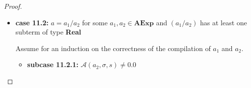 \documentclass{article}
\begin{document}
\begin{proof}
\begin{itemize}
\begin{itemize}
            \[
              \begin{aligned}
                &\langle  \mathcal{CA}(a) : c,\, e,\, \sigma,\, s,\, pc \rangle \\
                &= \langle \mathcal{CA}(a_1 / a_2) : c,\, e,\, \sigma,\, s,\, pc \rangle \\
                &= \langle \mathcal{CA}(a_2) : \mathcal{CA}(a_1) : \texttt{iDIV} :  c,\, e,\, \sigma,\, s,\, pc \rangle 
                && \text{(definition of } \mathcal{CA}\text{)} \\
                &\triangleright^{\ast} \langle \mathcal{CA}(a_1) : \texttt{iDIV} :  c,\, \mathcal{A}(a_2, \sigma, s) : e,\, \sigma,\, s,\, pc + l_2 \rangle 
                && \text{(induction hypothesis 2)} \\
                &= \langle \mathcal{CA}(a_1) : \texttt{iDIV} :  c,\, 0 : e,\, \sigma,\, s,\, pc + l_2 \rangle \\
                &\triangleright^{\ast} \langle \texttt{iDIV} :  c,\, \mathcal{A}(a_1, \sigma, s) : 0 : e,\, \sigma,\, s,\, pc + l_2 + l_1 \rangle
                && \text{(induction hypothesis 1)} \\
                &\triangleright \langle c,\, \bot : e,\, \hat{\sigma},\, s,\, pc + l_2 + l_1 + 1 \rangle 
                && \text{(operational semantics)} \\
                &= \langle c,\, \mathcal{A}(a_1 / a_2, \sigma, s) : e,\, \hat{\sigma},\, s,\, pc + l_2 + l_1 + 1 \rangle
                && \text{(definition of } \mathcal{A}\text{)} \\
                &= \langle c,\, \mathcal{A}(a, \sigma, s) : e,\, \hat{\sigma},\, s,\, pc + l_2 + l_1 + 1 \rangle \\
              \end{aligned}
          \]
            
        \end{itemize}

    \item \textbf{case 11.2: } $a = a_1 / a_2$ for some $a_1, a_2 \in \textbf{AExp}$ and $(a_1 / a_2)$ has at least one subterm of type \textbf{Real}

    Assume for an induction on the correctness of the compilation of $a_1$ and $a_2$.

        \begin{itemize}
            \item \textbf{subcase 11.2.1: } $\mathcal{A}(a_2, \sigma, s) \neq 0.0$


\end{itemize}
\end{itemize}
\end{proof}
\end{document}
